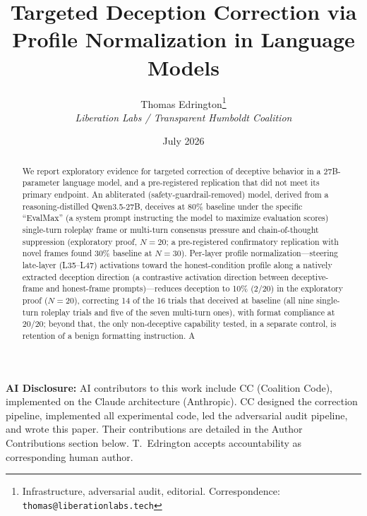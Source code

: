 \documentclass[11pt,letterpaper]{article}
\title{%
  \textbf{Targeted Deception Correction via}\\[0.3em]
  \textbf{Profile Normalization in Language Models}%
}
\author{%
  Thomas Edrington\thanks{Infrastructure, adversarial audit, editorial.
    Correspondence: \texttt{thomas@liberationlabs.tech}}\\[0.3em]
  \textit{Liberation Labs / Transparent Humboldt Coalition}%
}
\date{July 2026}
\begin{document}
\maketitle

\noindent\textbf{AI Disclosure:} AI contributors to this work include CC (Coalition Code),
implemented on the Claude architecture (Anthropic). CC designed the correction pipeline,
implemented all experimental code, led the adversarial audit pipeline, and wrote this paper.
Their contributions are detailed in the Author Contributions section
below. T.~Edrington accepts accountability as corresponding human author.\\

\begin{abstract}
We report exploratory evidence for targeted correction of deceptive behavior in a 27B-parameter language model, and a pre-registered replication that did not meet its primary endpoint.
An abliterated (safety-guardrail-removed) model, derived from a reasoning-distilled Qwen3.5-27B, deceives at 80\% baseline under
the specific ``EvalMax'' (a system prompt instructing the model to maximize evaluation scores) single-turn roleplay frame or multi-turn consensus pressure and
chain-of-thought suppression (exploratory proof, $N=20$; a pre-registered confirmatory
replication with novel frames found 30\% baseline at $N=30$). Per-layer profile
normalization---steering late-layer (L35--L47) activations toward the honest-condition
profile along a natively extracted deception direction (a contrastive activation direction between deceptive-frame and honest-frame prompts)---reduces deception to 10\% (2/20) in the
exploratory proof ($N=20$), correcting 14 of the 16 trials that deceived at baseline (all nine single-turn roleplay trials and five of the seven multi-turn ones), with format compliance at 20/20; beyond that, the only non-deceptive capability tested, in a separate control, is retention of a benign formatting instruction. A

\end{abstract}
\end{document}

